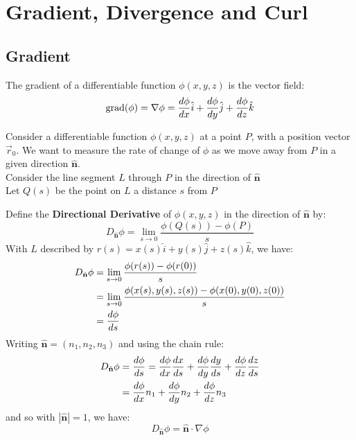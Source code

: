 \documentclass[a4paper, 10pt]{article}
\begin{document}
\pagebreak

\section{Gradient, Divergence and Curl}
\subsection{Gradient}
\begin{definitionbox}
  The gradient of a differentiable function $\phi(x,y,z)$ is the vector field:
  $$\text{grad}(\phi) =  \nabla \phi = \frac{d\phi}{dx} \hat{i} + \frac{d\phi}{dy} \hat{j} + \frac{d\phi}{dz} \hat{k}$$
\end{definitionbox}
Consider a differentiable function $\phi(x,y,z)$ at a point $P$, with a position vector $\vec{r}_0$. We want to measure the
rate of change of $\phi$ as we move away from $P$ in a given direction $\hat{\mathbf{n}}$. \\
Consider the line segment $L$ through $P$ in the direction of $\hat{\mathbf{n}}$ \\
Let $Q(s)$ be the point on $L$ a distance $s$ from $P$

Define the \textbf{Directional Derivative} of $\phi(x,y,z)$ in the direction of $\hat{\mathbf{n}}$ by:
$$D_{\hat{\mathbf{n}}} \phi = \lim_{s \to 0} \frac{\phi(Q(s)) - \phi(P)}{s}$$
With $L$ described by $r(s) = x(s) \hat{i} + y(s) \hat{j} + z(s) \hat{k}$, we have:
\begin{align*}
  D_{\hat{\mathbf{n}}} \phi & = \lim_{s \to 0} \frac{\phi(r(s)) - \phi(r(0))}{s}                         \\
                            & = \lim_{s \to 0} \frac{\phi(x(s), y(s), z(s)) - \phi(x(0), y(0), z(0))}{s} \\
                            & = \frac{d\phi}{ds}
\end{align*}
Writing $\hat{\mathbf{n}} = (n_1, n_2, n_3)$ and using the chain rule:
\begin{align}
  D_{\hat{\mathbf{n}}} \phi & = \frac{d\phi}{ds} = \frac{d\phi}{dx} \frac{dx}{ds} + \frac{d\phi}{dy} \frac{dy}{ds} + \frac{d\phi}{dz} \frac{dz}{ds} \nonumber \\
                            & = \frac{d\phi}{dx} n_1 + \frac{d\phi}{dy} n_2 + \frac{d\phi}{dz} n_3
\end{align}
and so with $|\hat{\mathbf{n}}| = 1$, we have:
$$D_{\hat{\mathbf{n}}} \phi = \hat{\mathbf{n}} \cdot \nabla \phi $$

\begin{center}
\end{center}
\end{document}
